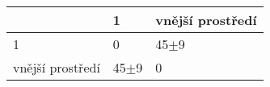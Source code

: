 \begin{tabular}{lll}
\toprule
{} &       1 & vnější prostředí \\
\midrule
1                &       0 &           45$\pm$9 \\
vnější prostředí &  45$\pm$9 &                0 \\
\bottomrule
\end{tabular}
